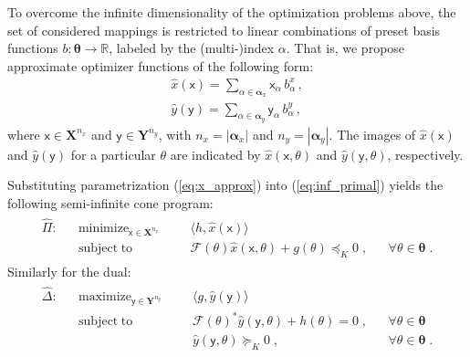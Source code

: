 \documentclass{article}
\DeclareMathOperator*{\minimize}{minimize}
\DeclareMathOperator*{\maximize}{maximize}
\DeclareMathOperator*{\subj}{subject\;to}
\newcommand{\R}{\mathbb{R}}         %
\newcommand{\ppar}{\theta}                          %
\newcommand{\Ppar}{{\bm{\theta}}}                   %
\newcommand{\X}{\mathbf{X}}                         %
\newcommand{\Y}{\mathbf{Y}}                         %
\newcommand{\calF}{\mathcal{F}}                     %
\newcommand{\bx}{b^x}               %
\newcommand{\bxa}{\bx_\alpha}       %
\newcommand{\cx}{\textsf{x}}        %
\newcommand{\cxa}{\cx_\alpha}       %
\newcommand{\nx}{{n_x}}             %
\newcommand{\by}{b^y}               %
\newcommand{\bya}{\by_\alpha}       %
\newcommand{\cy}{\textsf{y}}        %
\newcommand{\cya}{\cy_\alpha}       %
\newcommand{\ny}{{n_y}}             %
\newcommand{\Alpha}{\bm{\alpha}}    %
\begin{document}
To overcome the infinite dimensionality of the optimization problems above, the set of considered mappings is restricted to linear combinations of preset basis functions $b:\Ppar\rightarrow\R$, labeled by the (multi-)index $\alpha$. That is, we propose approximate optimizer functions of the following form:
\begin{subequations}\label{eq:xy_approx}
\begin{gather}
\hat{x}(\cx) = \sum_{\alpha\in\Alpha_x} \cxa \, \bxa \,, \label{eq:x_approx} \\%
\hat{y}(\cy) = \sum_{\alpha\in\Alpha_y} \cya \, \bya \,, \label{eq:y_approx}%
\end{gather}
\end{subequations}
where $\cx\in\X^\nx$ and $\cy\in\Y^\ny$, with $\nx=|\Alpha_x|$ and $\ny=|\Alpha_y|$. The images of $\hat{x}(\cx)$ and $\hat{y}(\cy)$ for a particular $\theta$ are indicated by $\hat{x}(\cx,\ppar)$ and $\hat{y}(\cy,\ppar)$, respectively.

Substituting parametrization (\ref{eq:x_approx}) into (\ref{eq:inf_primal}) yields the following semi-infinite cone program:
\begin{gather}\label{eq:semi-inf_primal}
\begin{aligned}
\hat{\Pi}: && \minimize_{\cx\in\X^\nx} &&& \langle h, \hat{x}(\cx) \rangle  \\%
           && \subj                    &&& \calF(\ppar) \hat{x}(\cx,\ppar) + g(\ppar)\preceq_K 0 \;, && \forall \ppar\in\Ppar\;.%
\end{aligned}
\end{gather}
Similarly for the dual:
\begin{gather}\label{eq:semi-inf_dual}
\begin{aligned}
\hat{\Delta}: && \maximize_{\cy\in\Y^\ny} &&& \langle g , \hat{y}(\cy) \rangle \\%
              && \subj                    &&& \calF(\ppar)^* \hat{y}(\cy,\ppar) + h(\ppar)= 0 \;, && \forall \ppar \in\Ppar\\%
              &&                          &&& \hat{y}(\cy,\ppar) \succeq_K 0                  \;, && \forall \ppar \in\Ppar\;.%
\end{aligned}
\end{gather}
\end{document}
